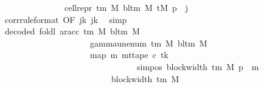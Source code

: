 \begin{isabellebody}
\ \ \ \ \ \ \ \ \ \ \ \ \ \ {\isacharequal}{\kern0pt}\ cell{\isacharunderscore}{\kern0pt}repr\ {\isacharparenleft}{\kern0pt}{\isasymGamma}{\isacharunderscore}{\kern0pt}tm\ M{\isacharparenright}{\kern0pt}\ {\isacharparenleft}{\kern0pt}bl{\isacharunderscore}{\kern0pt}tm\ M{\isacharparenright}{\kern0pt}\ {\isacharparenleft}{\kern0pt}tM\ p{\isacharparenright}{\kern0pt}\ {\isacharbang}{\kern0pt}\ j{\isachardoublequoteclose}\isanewline
\ \ \ \ \ \ \ \ \isamarkupfalse%
\ corr{\isacharbrackleft}{\kern0pt}rule{\isacharunderscore}{\kern0pt}format{\isacharcomma}{\kern0pt}\ OF\ jk{\isacharbrackright}{\kern0pt}\ jk\ \isamarkupfalse%
\ simp\isanewline
\ \ \ \ \isamarkupfalse%
\isanewline
\ \ \ \ \isamarkupfalse%
\ decoded{\isacharcolon}{\kern0pt}\ {\isachardoublequoteopen}foldl\ {\isacharparenleft}{\kern0pt}ar{\isacharunderscore}{\kern0pt}acc\ {\isacharparenleft}{\kern0pt}{\isasymGamma}{\isacharunderscore}{\kern0pt}tm\ M{\isacharparenright}{\kern0pt}\ {\isacharparenleft}{\kern0pt}bl{\isacharunderscore}{\kern0pt}tm\ M{\isacharparenright}{\kern0pt}{\isacharparenright}{\kern0pt}\isanewline
\ \ \ \ \ \ \ \ \ \ \ \ \ \ \ \ \ \ \ \ \ {\isacharparenleft}{\kern0pt}gamma{\isacharunderscore}{\kern0pt}unenum\ {\isacharparenleft}{\kern0pt}{\isasymGamma}{\isacharunderscore}{\kern0pt}tm\ M{\isacharparenright}{\kern0pt}\ {\isacharparenleft}{\kern0pt}bl{\isacharunderscore}{\kern0pt}tm\ M{\isacharparenright}{\kern0pt}\ {}{\isacharparenright}{\kern0pt}\isanewline
\ \ \ \ \ \ \ \ \ \ \ \ \ \ \ \ \ \ \ \ \ {\isacharparenleft}{\kern0pt}map\ {\isacharparenleft}{\kern0pt}{\isasymlambda}m{\isachardot}{\kern0pt}\ mt{\isacharunderscore}{\kern0pt}tape\ c{\isacharprime}{\kern0pt}\ tk\isanewline
\ \ \ \ \ \ \ \ \ \ \ \ \ \ \ \ \ \ \ \ \ \ \ \ \ \ \ \ \ \ \ \ {\isacharparenleft}{\kern0pt}sim{\isacharunderscore}{\kern0pt}pos\ {\isacharparenleft}{\kern0pt}block{\isacharunderscore}{\kern0pt}width\ {\isacharparenleft}{\kern0pt}{\isasymGamma}{\isacharunderscore}{\kern0pt}tm\ M{\isacharparenright}{\kern0pt}{\isacharparenright}{\kern0pt}\ p\ {\isacharplus}{\kern0pt}\ m{\isacharparenright}{\kern0pt}{\isacharparenright}{\kern0pt}\isanewline
\ \ \ \ \ \ \ \ \ \ \ \ \ \ \ \ \ \ \ \ \ \ \ \ \ \ {\isacharbrackleft}{\kern0pt}{}{\isachardot}{\kern0pt}{\isachardot}{\kern0pt}{\isacharless}{\kern0pt}block{\isacharunderscore}{\kern0pt}width\ {\isacharparenleft}{\kern0pt}{\isasymGamma}{\isacharunderscore}{\kern0pt}tm\ M{\isacharparenright}{\kern0pt}{\isacharbrackright}{\kern0pt}{\isacharparenright}{\kern0pt}\isanewline

\end{isabellebody}
